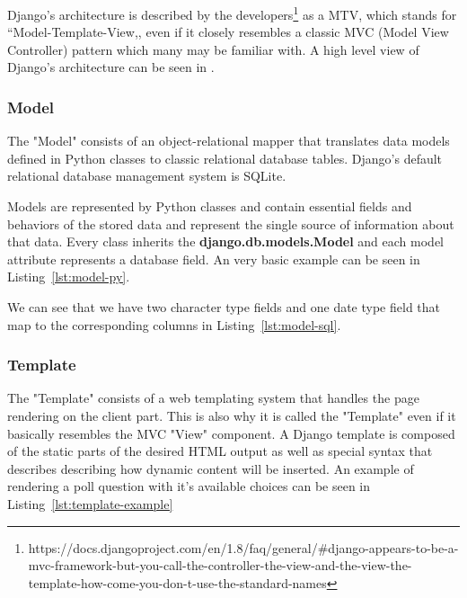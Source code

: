 Django's architecture is described by the developers\footnote{https://docs.djangoproject.com/en/1.8/faq/general/\#django-appears-to-be-a-mvc-framework-but-you-call-the-controller-the-view-and-the-view-the-template-how-come-you-don-t-use-the-standard-names\label{note1}} as a MTV, which stands for ``Model-Template-View,, even if it closely resembles a classic MVC (Model View Controller) pattern which many may be familiar with. A high level view of Django's architecture can be seen in .


\subsubsection{Model}
\label{sub-sub-sec:model}

The "Model" consists of an object-relational mapper that translates data models defined in Python classes to classic relational database tables. Django's default relational database management system is SQLite.

Models are represented by Python classes and contain essential fields and behaviors of the stored data and represent the single source of information about that data. Every class inherits the \textbf{django.db.models.Model} and each model attribute represents a database field. An very basic example can be seen in Listing~\ref{lst:model-py}.



We can see that we have two character type fields and one date type field that map to the corresponding columns in Listing~\ref{lst:model-sql}.



\subsubsection{Template}
\label{sub-sub-sec:template}

The "Template" consists of a web templating system that handles the page rendering on the client part. This is also why it is called the "Template" even if it basically resembles the MVC "View" component. A Django template is composed of the static parts of the desired HTML output as well as special syntax that describes describing how dynamic content will be inserted. An example of rendering a poll question with it's available choices can be seen in Listing~\ref{lst:template-example}

